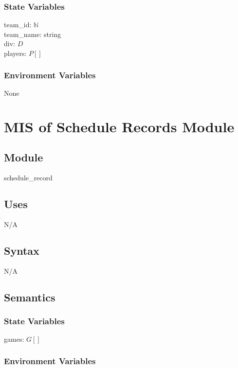 \documentclass[12pt, titlepage]{article}
\begin{document}
\subsubsection{State Variables}

team\_id: $\mathbb{N}$\\
team\_name: string\\
div: $D$\\
players: $P[]$\\

\subsubsection{Environment Variables}

None

\newpage

\section{MIS of Schedule Records Module} \label{mSS}

\subsection{Module}

schedule\_record

\subsection{Uses}

N/A

\subsection{Syntax}

N/A

\subsection{Semantics}

\subsubsection{State Variables}

games: $G[]$

\subsubsection{Environment Variables}
\end{document}
